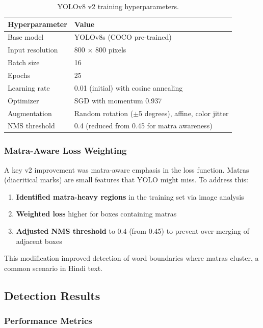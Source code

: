 \documentclass[14pt,a4paper]{article}
\begin{document}
\begin{table}[h]
    \centering
    \begin{tabular}{ll}
        \toprule
        \textbf{Hyperparameter} & \textbf{Value} \\
        \midrule
        Base model & YOLOv8s (COCO pre-trained) \\
        Input resolution & 800 × 800 pixels \\
        Batch size & 16 \\
        Epochs & 25 \\
        Learning rate & 0.01 (initial) with cosine annealing \\
        Optimizer & SGD with momentum 0.937 \\
        Augmentation & Random rotation ($\pm$5 degrees), affine, color jitter \\
        NMS threshold & 0.4 (reduced from 0.45 for matra awareness) \\
        \bottomrule
    \end{tabular}
    \caption{YOLOv8 v2 training hyperparameters.}
\end{table}

\subsubsection{Matra-Aware Loss Weighting}

A key v2 improvement was matra-aware emphasis in the loss function. Matras (diacritical marks) are small features that YOLO might miss. To address this:

\begin{enumerate}
    \item \textbf{Identified matra-heavy regions} in the training set via image analysis
    \item \textbf{Weighted loss} higher for boxes containing matras
    \item \textbf{Adjusted NMS threshold} to 0.4 (from 0.45) to prevent over-merging of adjacent boxes
\end{enumerate}

This modification improved detection of word boundaries where matras cluster, a common scenario in Hindi text.

\subsection{Detection Results}

\subsubsection{Performance Metrics}
\end{document}
